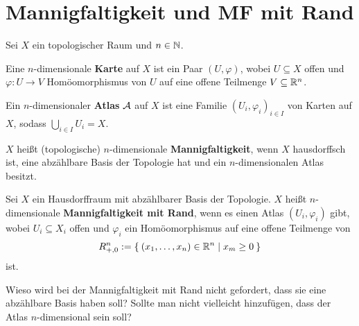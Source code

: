 \documentclass[a5paper,oneside]{scrbook}
\begin{document}
\section{Mannigfaltigkeit und MF mit Rand}
\begin{definition}%
    Sei $X$ ein topologischer Raum und $n \in \mathbb{N}$.
    \begin{defenum}
        \item Eine $n$-dimensionale \textbf{Karte} auf
              $X$ ist ein Paar $(U, \varphi)$, wobei $U \subseteq X$
              offen und $\varphi: U \rightarrow V$ Homöomorphismus
              von $U$ auf eine offene Teilmenge $V \subseteq \mathbb{R}^n$.
        \item Ein $n$-dimensionaler \textbf{Atlas} $\mathcal{A}$ auf $X$ ist eine
              Familie $(U_i, \varphi_i)_{i \in I}$ von Karten auf $X$,
              sodass $\bigcup_{i \in I} U_i = X$.
        \item $X$ heißt (topologische) $n$-dimensionale \textbf{Mannigfaltigkeit},
              wenn $X$ hausdorffsch ist, eine abzählbare Basis der 
              Topologie hat und ein $n$-dimensionalen Atlas besitzt.
    \end{defenum}
\end{definition}
\begin{definition}%
    Sei $X$ ein Hausdorffraum mit abzählbarer Basis der Topologie.
    $X$ heißt $n$-dimensionale \textbf{Mannigfaltigkeit mit Rand},
    wenn es einen Atlas $(U_i, \varphi_i)$ gibt, wobei $U_i \subseteq X_i$
    offen und $\varphi_i$ ein Homöomorphismus auf eine offene 
    Teilmenge von 
    \[R_{+,0}^n := \Set{(x_1, \dots, x_n) \in \ensuremath{\mathbb{R}}^n | x_m \geq 0}\]
    ist.
\end{definition}

Wieso wird bei der Mannigfaltigkeit mit Rand nicht gefordert, dass
sie eine abzählbare Basis haben soll? Sollte man nicht vielleicht
hinzufügen, dass der Atlas $n$-dimensional sein soll?
\end{document}
